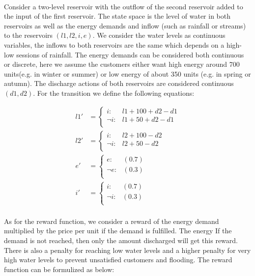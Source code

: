 \documentclass[letterpaper]{article}
\renewcommand{\-}{\text{-}}
\begin{document}
\paragraph{\MultiWaterReservoir} Consider a two-level reservoir with the outflow of the second reservoir added to the input of the first reservoir. The state space is the level of water in both reservoirs as well as the energy demands and inflow (such as rainfall or streams) to the reservoirs $(l1,l2,i,e)$. We consider the water levels as continuous variables, the inflows to both reservoirs are the same which depends on a high-low sessions of rainfall. The energy demands can be considered both continuous or discrete, here we assume the customers either want high energy around 700 units(e.g. in winter or summer) or low energy of about 350 units (e.g. in spring or autumn). 
The discharge actions of both reservoirs are considered continuous $(d1,d2)$. For the transition we define the following equations: 

{\footnotesize
\begin{align*}
l1' & = \begin{cases}
i     : & l1 + 100 +d2  - d1 \\
\neg i: &  l1 + 50 +d2  - d1   \\
\end{cases}\\
l2' & =  \begin{cases}
i     : &l2+100 - d2\\
\neg i: &l2+50 - d2\\
 \end{cases}\\
 e' & = \begin{cases}
 e     : & (0.7) \\
 \neg e: &  (0.3)   \\
 \end{cases}\\
i' & = \begin{cases}
i     : & (0.7) \\
\neg i: &  (0.3)   \\
\end{cases}\\
\end{align*}}

As for the reward function, we consider a reward of the energy demand multiplied by the price per unit if the demand is fulfilled. The energy  If the demand is not reached, then only
the amount discharged will get this reward. There is also a penalty for reaching low water levels and a higher penalty for very high water levels to prevent unsatisfied customers and  flooding. The reward function can be formulized as below: 
\end{document}

